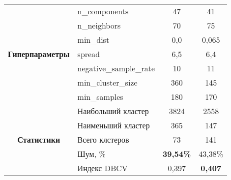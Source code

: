 \begin{table}[!htbp]
\begin{longtable}[c]{|cl|cc|}
    \multicolumn{1}{|c|}{\multirow{7}{*}{\textbf{Гиперпараметры}}} & n\_components             & \multicolumn{1}{c|}{47}                & \multicolumn{1}{c|}{41}             \\
    \multicolumn{1}{|c|}{}                                          & n\_neighbors             & \multicolumn{1}{c|}{70}                & \multicolumn{1}{c|}{75}             \\
    \multicolumn{1}{|c|}{}                                          & min\_dist                & \multicolumn{1}{c|}{0,0}               & \multicolumn{1}{c|}{0,065}          \\
    \multicolumn{1}{|c|}{}                                          & spread                   & \multicolumn{1}{c|}{6,5}               & \multicolumn{1}{c|}{6,4}            \\
    \multicolumn{1}{|c|}{}                                          & negative\_sample\_rate   & \multicolumn{1}{c|}{10}                & \multicolumn{1}{c|}{11}             \\
    \multicolumn{1}{|c|}{}                                          & min\_cluster\_size       & \multicolumn{1}{c|}{360}               & \multicolumn{1}{c|}{145}            \\
    \multicolumn{1}{|c|}{}                                          & min\_samples             & \multicolumn{1}{c|}{180}               & \multicolumn{1}{c|}{170}            \\ \hline
    \multicolumn{1}{|c|}{\multirow{5}{*}{\textbf{Статистики}}}      & Наибольший кластер       & \multicolumn{1}{c|}{3824}              & \multicolumn{1}{c|}{2558}           \\
    \multicolumn{1}{|c|}{}                                          & Наименьший кластер       & \multicolumn{1}{c|}{365}               & \multicolumn{1}{c|}{147}            \\
    \multicolumn{1}{|c|}{}                                          & Всего клстеров           & \multicolumn{1}{c|}{73}                & \multicolumn{1}{c|}{141}            \\
    \multicolumn{1}{|c|}{}                                          & Шум, \%                  & \multicolumn{1}{c|}{\textbf{39,54\%}}  & \multicolumn{1}{c|}{43,38\%}        \\
    \multicolumn{1}{|c|}{}                                          & Индекс DBCV              & \multicolumn{1}{c|}{0,397}             & \multicolumn{1}{c|}{\textbf{0,407}} \\ \hline
\end{longtable}
\end{table}